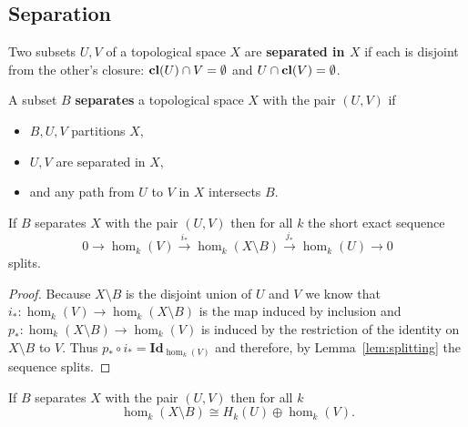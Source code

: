 
\subsection{Separation}

\begin{definition}[Separated]
  Two subsets $U, V$ of a topological space $X$ are \textbf{separated in $X$} if each is disjoint from the other's closure: $\mathbf{cl}(U)\cap V =\emptyset$ and $U\cap\mathbf{cl}(V) = \emptyset$.
\end{definition}

\begin{definition}[Separation]
  A subset $B$ \textbf{separates} a topological space $X$ with the pair $(U, V)$ if
  \begin{itemize}
    \item $B, U, V$ partitions $X$,
    \item $U, V$ are separated in $X$,
    \item and any path from $U$ to $V$ in $X$ intersects $B$.
  \end{itemize}
\end{definition}

\begin{lemma}\label{lem:separate_splits}
  If $B$ separates $X$ with the pair $(U, V)$ then for all $k$ the short exact sequence
  \[ 0\to \hom_k(V)\xrightarrow{i_*} \hom_k(X\setminus B)\xrightarrow{j_*} \hom_k(U)\to 0\]
  splits.
\end{lemma}
\begin{proof}
  Because $X\setminus B$ is the disjoint union of $U$ and $V$ we know that $i_* : \hom_k(V)\to \hom_k(X\setminus B)$ is the map induced by inclusion and $p_* : \hom_k(X\setminus B)\to \hom_k(V)$ is induced by the restriction of the identity on $X\setminus B$ to $V$.
  Thus $p_*\circ i_* = \mathbf{Id}_{\hom_k(V)}$ and therefore, by Lemma~\ref{lem:splitting} the sequence splits.%
\end{proof}

\begin{corollary}\label{cor:oplus_separates}
    If $B$ separates $X$ with the pair $(U, V)$ then for all $k$
    \[ \hom_k(X\setminus B) \cong H_k(U)\oplus \hom_k(V). \]
\end{corollary}

